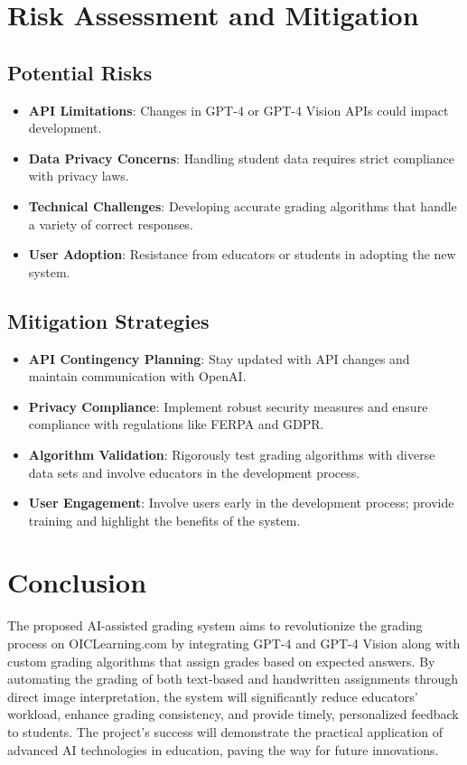 \documentclass[ms,twoside,print]{nuthesis}
\begin{document}
\section{Risk Assessment and Mitigation}

\subsection{Potential Risks}

\begin{itemize}
    \item \textbf{API Limitations}: Changes in GPT-4 or GPT-4 Vision APIs could impact development.
    \item \textbf{Data Privacy Concerns}: Handling student data requires strict compliance with privacy laws.
    \item \textbf{Technical Challenges}: Developing accurate grading algorithms that handle a variety of correct responses.
    \item \textbf{User Adoption}: Resistance from educators or students in adopting the new system.
\end{itemize}

\subsection{Mitigation Strategies}

\begin{itemize}
    \item \textbf{API Contingency Planning}: Stay updated with API changes and maintain communication with OpenAI.
    \item \textbf{Privacy Compliance}: Implement robust security measures and ensure compliance with regulations like FERPA and GDPR.
    \item \textbf{Algorithm Validation}: Rigorously test grading algorithms with diverse data sets and involve educators in the development process.
    \item \textbf{User Engagement}: Involve users early in the development process; provide training and highlight the benefits of the system.
\end{itemize}

\section{Conclusion}

The proposed AI-assisted grading system aims to revolutionize the grading process on OICLearning.com by integrating GPT-4 and GPT-4 Vision along with custom grading algorithms that assign grades based on expected answers. By automating the grading of both text-based and handwritten assignments through direct image interpretation, the system will significantly reduce educators' workload, enhance grading consistency, and provide timely, personalized feedback to students. The project's success will demonstrate the practical application of advanced AI technologies in education, paving the way for future innovations.
\end{document}
